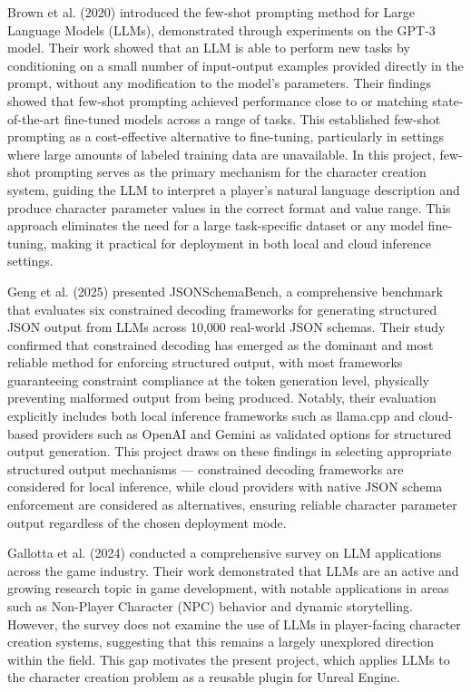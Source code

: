 Brown et al. (2020) \cite{brown2020languagemodelsfewshotlearners} introduced the few-shot prompting method for Large Language Models (LLMs), demonstrated through experiments on the GPT-3 model. Their work showed that an LLM is able to perform new tasks by conditioning on a small number of input-output examples provided directly in the prompt, without any modification to the model's parameters. Their findings showed that few-shot prompting achieved performance close to or matching state-of-the-art fine-tuned models across a range of tasks. This established few-shot prompting as a cost-effective alternative to fine-tuning, particularly in settings where large amounts of labeled training data are unavailable. In this project, few-shot prompting serves as the primary mechanism for the character creation system, guiding the LLM to interpret a player's natural language description and produce character parameter values in the correct format and value range. This approach eliminates the need for a large task-specific dataset or any model fine-tuning, making it practical for deployment in both local and cloud inference settings. \newline

Geng et al. (2025) \cite{geng2025jsonschemabenchrigorousbenchmarkstructured} presented JSONSchemaBench, a comprehensive benchmark that evaluates six constrained decoding frameworks for generating structured JSON output from LLMs across 10,000 real-world JSON schemas. Their study confirmed that constrained decoding has emerged as the dominant and most reliable method for enforcing structured output, with most frameworks guaranteeing constraint compliance at the token generation level, physically preventing malformed output from being produced. Notably, their evaluation explicitly includes both local inference frameworks such as llama.cpp and cloud-based providers such as OpenAI and Gemini as validated options for structured output generation. This project draws on these findings in selecting appropriate structured output mechanisms — constrained decoding frameworks are considered for local inference, while cloud providers with native JSON schema enforcement are considered as alternatives, ensuring reliable character parameter output regardless of the chosen deployment mode.

Gallotta et al. (2024) \cite{Gallotta_2024} conducted a comprehensive survey on LLM applications across the game industry. Their work demonstrated that LLMs are an active and growing research topic in game development, with notable applications in areas such as Non-Player Character (NPC) behavior and dynamic storytelling. However, the survey does not examine the use of LLMs in player-facing character creation systems, suggesting that this remains a largely unexplored direction within the field. This gap motivates the present project, which applies LLMs to the character creation problem as a reusable plugin for Unreal Engine. \newline

